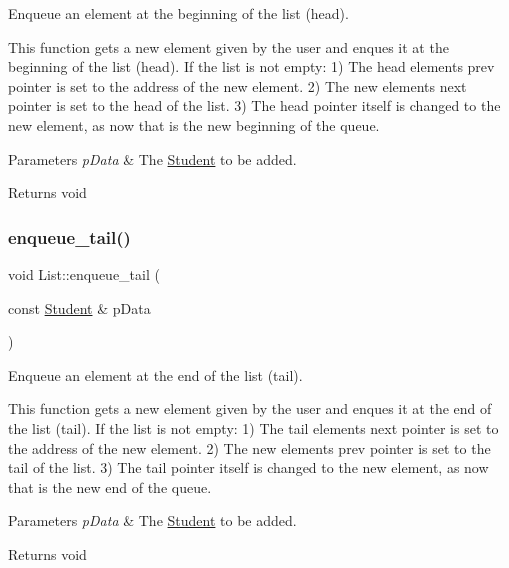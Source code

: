 Enqueue an element at the beginning of the list (head). 

This function gets a new element given by the user and enques it at the beginning of the list (head). If the list is not empty\+: 1) The head element\textquotesingle{}s prev pointer is set to the address of the new element. 2) The new element\textquotesingle{}s next pointer is set to the head of the list. 3) The head pointer itself is changed to the new element, as now that is the new beginning of the queue.


\begin{DoxyParams}{Parameters}
{\em p\+Data} & The \hyperlink{class_student}{Student} to be added. \\
\hline
\end{DoxyParams}
\begin{DoxyReturn}{Returns}
void 
\end{DoxyReturn}
\mbox{\label{class_list_a8d121a27df3b8984d0ac7edc87d14af5}} 
\subsubsection{\texorpdfstring{enqueue\+\_\+tail()}{enqueue\_tail()}}
{\footnotesize\ttfamily void List\+::enqueue\+\_\+tail (\begin{DoxyParamCaption}\item[{const \hyperlink{class_student}{Student} \&}]{p\+Data }\end{DoxyParamCaption})}



Enqueue an element at the end of the list (tail). 

This function gets a new element given by the user and enques it at the end of the list (tail). If the list is not empty\+: 1) The tail element\textquotesingle{}s next pointer is set to the address of the new element. 2) The new element\textquotesingle{}s prev pointer is set to the tail of the list. 3) The tail pointer itself is changed to the new element, as now that is the new end of the queue.


\begin{DoxyParams}{Parameters}
{\em p\+Data} & The \hyperlink{class_student}{Student} to be added. \\
\hline
\end{DoxyParams}
\begin{DoxyReturn}{Returns}
void 
\end{DoxyReturn}
\mbox{\label{class_list_aeff87699c50ed381ba1e765d372ad54b}} 
